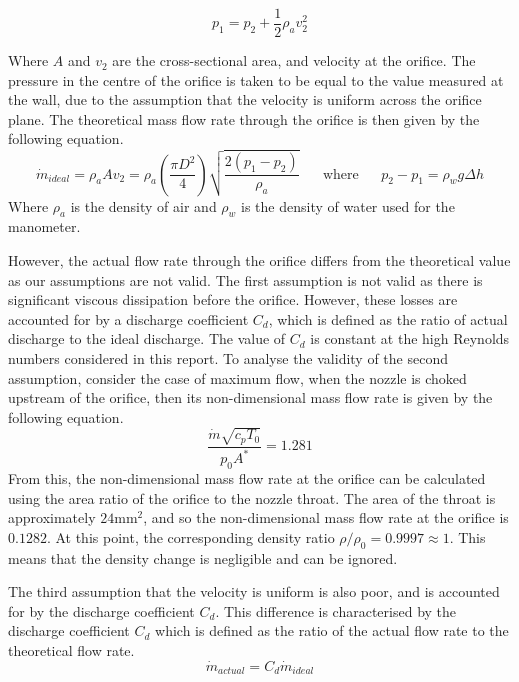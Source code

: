 \documentclass{article}
\begin{document}
\begin{equation}
    p_1 = p_2 + \frac{1}{2} \rho_a v_2^2
\end{equation}

Where $A$ and $v_2$ are the cross-sectional area, and velocity at the orifice. The pressure in the centre of the orifice is taken to be equal to the value measured at the wall, due to the assumption that the velocity is uniform across the orifice plane.
The theoretical mass flow rate through the orifice is then given by the following equation.
\begin{equation}
    \dot{m}_{ideal} = \rho_a A v_2 = \rho_a \left( \frac{\pi D^2}{4}\right) \sqrt{\frac{2(p_1-p_2)}{\rho_a}} \;\;\;\;\;\; \text{where} \;\;\;\;\;\ p_2 - p_1 = \rho_w g \Delta h
\end{equation}
Where $\rho_a$ is the density of air and $\rho_w$ is the density of water used for the manometer.

However, the actual flow rate through the orifice differs from the theoretical value as our assumptions are not valid.
The first assumption is not valid as there is significant viscous dissipation before the orifice.
However, these losses are accounted for by a discharge coefficient $C_d$, which is defined as the ratio of actual discharge to the ideal discharge.
The value of $C_d$ is constant at the high Reynolds numbers considered in this report.
To analyse the validity of the second assumption, consider the case of maximum flow, when the nozzle is choked upstream of the orifice, then its non-dimensional mass flow rate is given by the following equation.
\begin{equation}
    \frac{\dot{m}\sqrt{c_pT_0}}{p_0A^*} = 1.281
\end{equation}
From this, the non-dimensional mass flow rate at the orifice can be calculated using the area ratio of the orifice to the nozzle throat.
The area of the throat is approximately $24\text{mm}^2$, and so the non-dimensional mass flow rate at the orifice is $0.1282$.
At this point, the corresponding density ratio $\rho/\rho_0 = 0.9997 \approx 1$. This means that the density change is negligible and can be ignored.

The third assumption that the velocity is uniform is also poor, and is accounted for by the discharge coefficient $C_d$.
This difference is characterised by the discharge coefficient $C_d$ which is defined as the ratio of the actual flow rate to the theoretical flow rate.
\begin{equation}
    \dot{m}_{actual} = C_d \dot{m}_{ideal}
\end{equation}
\end{document}
